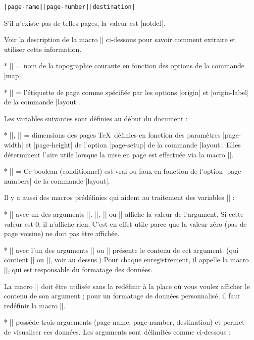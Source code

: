     {\tt|page-name||page-number||destination|}
    
    S'il n'existe pas de telles pages, la valeur est |notdef|.

    Voir la description de la macro |\processpointeritem| ci-dessous pour savoir comment extraire et utiliser cette information.

  * |\pagename| = nom de la topographie courante en fonction des options de la commande |map|.

  * |\pagelabel| = l'\'etiquette de page comme sp\'ecifi\'ee par les options |origin| et |origin-label| de la commande |layout|.
\endlist


Les variables suivantes sont d\'efinies au d\'ebut du document :

\list
  * |\hsize|, |\vsize| = dimensions des pages \TeX\, d\'efinies en fonction des param\`etres  |page-width|
    et |page-height| de l'option |page-setup| de la commande |layout|. 
    Elles d\'eterminent l'aire utile lorsque la mise en page est effectu\'ee via la macro |\dopage|.

  * |\ifpagenumbering| = Ce boolean (conditionnel) est vrai ou faux en fonction de l'option |page-numbers| de la commande |layout|.
\endlist

Il y a aussi des macros pr\'ed\'efinies qui aident au traitement des variables |\pointer*| :

\list
  * |\showpointer| avec un des arguments |\pointerE|, |\pointerW|, |\pointerN| ou
    |\pointerS| affiche la valeur de l'argument. Si cette valeur est 0, il n'affiche rien.
    C'est en effet utile parce que la valeur z\'ero (pas de page voisine) ne doit pas \^etre affich\'ee.
    
  * |\showpointerlist| avec l'un des arguments |\pointerU| ou |\pointerD| pr\'esente le contenu de cet argument. 
    (qui contient |\pointerU| ou |\pointerD|, voir au dessus.) Pour chaque enregistrement, il appelle la macro
    |\processpointeritem|, qui est responsable du formatage des donn\'ees. 
    
    La macro |\showpointerlist| doit \^etre utilis\'ee sans la red\'efinir \`a la place o\`u vous voulez afficher le contenu de son argument ;
    pour un formatage de donn\'ees personnalis\'e, il faut red\'efinir la macro |\processpointeritem|.
         
  * |\processpointeritem| poss\`ede trois arguements (page-name, page-number, 
    destination) et permet de visualiser ces donn\'ees. Les arguments sont d\'elimit\'es comme ci-dessous :
    
